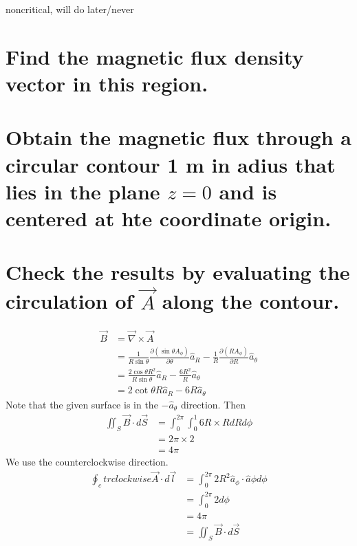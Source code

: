 \documentclass[answers]{exam}
\begin{document}
\begin{questions}

\begin{solution}
	noncritical, will do later/never
\end{solution}


\begin{parts}
	\part{Find the magnetic flux density vector in this region.}
	\part{Obtain the magnetic flux through a circular contour 1 m in adius that lies in the plane $z=0$ and is centered at hte coordinate origin.}
	\part{Check the results by evaluating the circulation of $\vec A$ along the contour.}
\end{parts}

\begin{solution}
	\begin{align*}
		\vec B &= \vec \nabla \times \vec A \\
		       & = \frac{1}{R\sin\theta} \frac{\partial (\sin\theta A_\phi)}{\partial \theta} \hat a_R - \frac{1}{R} \frac{\partial (RA_\phi)}{\partial R} \hat a_\theta \\
		       &= \frac{2\cos\theta R^2}{R\sin\theta} \hat a_R - \frac{6R^2}{R} \hat a_\theta \\
		       &= 2\cot\theta R \hat a_R - 6R \hat a_\theta
	\end{align*}
	Note that the given surface is in the $-\hat a_\theta$ direction. Then
	\begin{align*}
		\iint_S \vec B \cdot d\vec S &= \int_0^{2\pi} \int_0^1 6R\times R dR d\phi \\
					     &= 2\pi \times 2 \\
					     &= 4\pi
	\end{align*}
	We use the counterclockwise direction.
	\begin{align*}
		\oint_ctrclockwise \vec A \cdot d\vec l &= \int_0^{2\pi} 2R^2 \hat a_\phi \cdot \hat a\phi d\phi \\
							&= \int_0^{2\pi} 2 d\phi \\
							&= 4\pi \\
							&= \iint_S \vec B \cdot d\vec S
	\end{align*}
\end{solution}


\end{questions}
\end{document}
